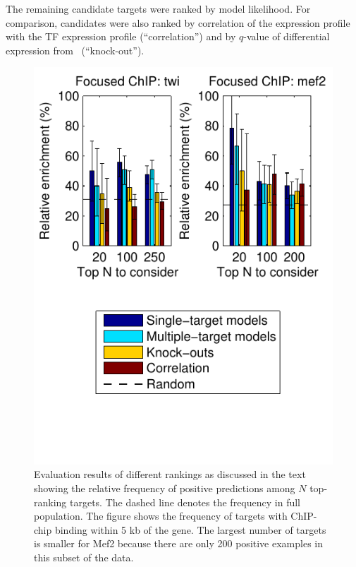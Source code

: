 \documentclass{pnastwo}
\begin{document}
\begin{article}
The remaining candidate targets were ranked by model likelihood.  For
comparison, candidates were also ranked by correlation of the
expression profile with the TF expression profile (``correlation'')
and by $q$-value of differential expression
from~\cite{Sandmann2006a,Sandmann2007a} (``knock-out'').

\begin{figure}[htb]
  \centering
  \includegraphics[trim=0mm 15mm 0mm 0mm]{dros_focused_evaluation}
  \caption{Evaluation results of different rankings as
    discussed in the text showing the relative frequency of positive
    predictions among $N$ top-ranking targets.  The dashed line
    denotes the frequency in full population.  The figure shows the
    frequency of
    targets with ChIP-chip binding within 5 kb of the gene.
    The largest number of targets is smaller for Mef2 because there
    are only 200 positive examples in this subset of the data.}
  \label{fig:dros_focused_evaluation}
\end{figure}


\end{article}
\end{document}
